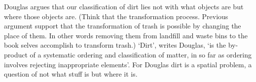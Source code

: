 Douglas argues that our classification of dirt lies not with what objects are but where those objects are. (Think that the transformation process. Previous argument support that the transformation of trash is possible by changing the place of them. In other words removing them from landfill and waste bins to the book selves accomplish to transform trash.) ‘Dirt’, writes Douglas, ‘is the by-product of a systematic ordering and classification of matter, in so far as ordering involves rejecting inappropriate elements’. For Douglas dirt is a spatial problem, a question of not what stuff is but where it is.










